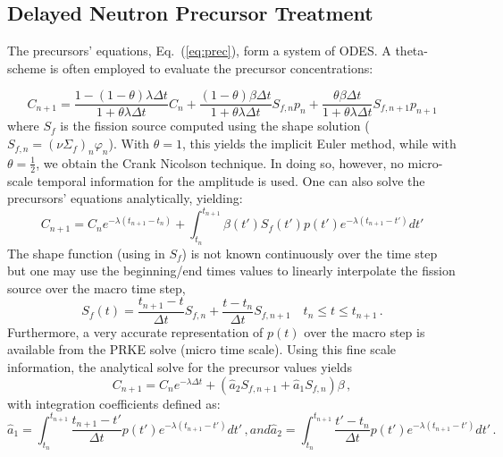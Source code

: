 \documentclass{elsarticle}
\newcommand{\eqt}[1]{Eq.~(\ref{#1})}                     %
\newcommand{\be}{\begin{equation}}
\newcommand{\ee}{\end{equation}}
\begin{document}
\subsection{Delayed Neutron Precursor Treatment}


The precursors' equations, \eqt{eq:prec}, form a system of ODES. %
A theta-scheme is often employed to evaluate the precursor concentrations:

\be
C_{n+1} = \frac{1-(1-\theta) \lambda\Delta t}{1+\theta \lambda\Delta t}C_n + \frac{(1-\theta) \beta\Delta t}{1+\theta \lambda\Delta t}S_{f,n} p_n +  \frac{\theta \beta\Delta t}{1+\theta \lambda\Delta t}S_{f,n+1} p_{n+1}
\label{eq:dnp_theta}
\ee
where $S_f$ is the fission source computed using the shape solution ($S_{f,n}=(\nu\Sigma_f)_n\varphi_n$). With
$\theta=1$, this yields the implicit Euler method, while with $\theta=\tfrac 1 2$, we obtain the Crank 
Nicolson technique. In doing so, however, no micro-scale temporal information for the amplitude is used.
One can also solve the precursors' equations analytically, yielding:
\be
C_{n+1} =  C_n e^{-\lambda (t_{n+1} - t_n) }  + \int_{t_n}^{t_{n+1}} \beta(t') S_f(t') p(t')e^{-\lambda (t_{n+1}-t')}dt'
\label{eq:prec_an}
\ee
The shape function (using in $S_f$) is not known continuously over the time step but one may use the beginning/end times values
to linearly interpolate the fission source over the macro time step,
\be
S_f(t) = \frac{t_{n+1}-t}{\Delta t}S_{f,n}  + \frac{t-t_n}{\Delta t}S_{f,n+1}  \quad t_n \le t \le t_{n+1} \,.
\ee
Furthermore, a very accurate representation of $p(t)$ over the macro step is available from the PRKE solve (micro time scale). 
Using this fine scale information, the analytical solve for the precursor values yields
\be
C_{n+1} = C_n e^{-\lambda \Delta t} + \left(\hat{a}_2 S_{f,n+1}+\hat{a}_1 S_{f,n}\right)\beta \,,
\label{eq:dnp_an}
\ee
with integration coefficients defined as:
\begin{subequations}
\be
\hat{a}_1= \int_{t_n}^{t_{n+1}}\frac{t_{n+1}-t'}{\Delta t}p(t')e^{-\lambda(t_{n+1}-t')}dt' \,,
\ee
and
\be
\hat{a}_2 = \int_{t_n}^{t_{n+1}}\frac{t'-t_n}{\Delta t}p(t')e^{-\lambda(t_{n+1}-t')}dt'  \,.
\ee
\end{subequations}
\end{document}
